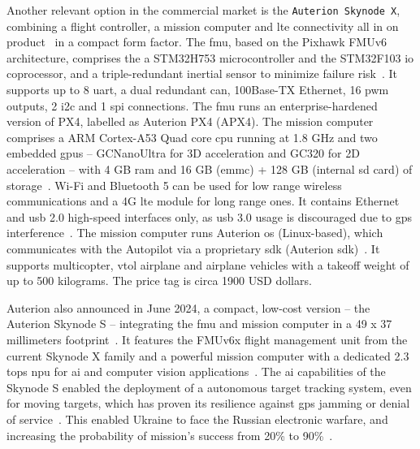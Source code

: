 Another relevant option in the commercial market is the \lstinline{Auterion Skynode X},
combining a flight controller, a mission computer and \gls{lte} connectivity all
in on product~\cite{skynodeXWebsite} in a compact form factor.
%
The \gls{fmu}, based on the Pixhawk FMUv6 architecture, comprises the 
a STM32H753 microcontroller and the STM32F103 \gls{io} coprocessor, and a
triple-redundant inertial sensor to minimize failure risk~\cite{skynodeXDatasheet}.
It supports up to 8 \gls{uart}, a dual redundant \gls{can},
100Base-TX Ethernet, 16 \gls{pwm} outputs, 2 \gls{i2c} and 1 \gls{spi}
connections. The \gls{fmu} runs an enterprise-hardened version of PX4, labelled
as Auterion PX4 (APX4)\cite{skynodeXDatasheet}.
%
%
The mission computer comprises a ARM Cortex-A53 Quad core \gls{cpu} running at
1.8 GHz and two embedded \glspl{gpu} -- GCNanoUltra for 3D acceleration and GC320 for
2D acceleration -- with 4 GB \gls{ram} and 16 GB (\gls{emmc}) + 128 GB (internal
\gls{sd} card) of storage~\cite{skynodeXDatasheet}. Wi-Fi and Bluetooth 5 can be used for low range
wireless communications and a 4G \gls{lte} module for long range ones. It
contains Ethernet and \gls{usb} 2.0 high-speed interfaces only, as \gls{usb} 3.0 usage is discouraged
due to \gls{gps} interference~\cite{skynodeXDatasheet}.
The mission computer runs Auterion
\gls{os} (Linux-based), which communicates with the Autopilot via a proprietary
\gls{sdk} (Auterion \gls{sdk})~\cite{skynodeX-px4}.
%
It supports multicopter, \gls{vtol} airplane and airplane vehicles with a
takeoff weight of up to 500 kilograms. The price tag is circa 1900 USD
dollars\cite{skynodePrice}.

Auterion also announced in June 2024, a compact, low-cost version -- the
Auterion Skynode S -- integrating the \gls{fmu} and mission computer in a 49 x
37 millimeters footprint~\cite{skynodeS-pressRelease}. It features the FMUv6x
flight management unit from the current Skynode X family and a powerful mission
computer with a dedicated 2.3 \gls{tops} \gls{npu} for \gls{ai} and computer
vision applications~\cite{skynodeS-pressRelease}.
%
%
The \gls{ai} capabilities of the Skynode S enabled the deployment of a
autonomous target tracking system, even for moving targets, which has proven its resilience against
\gls{gps} jamming or denial of service~\cite{skynodeS-noJamming}. This enabled
Ukraine to face the Russian electronic warfare, and increasing the probability
of mission's success from 20\% to 90\%~\cite{skynodeS-noJamming-2}.

